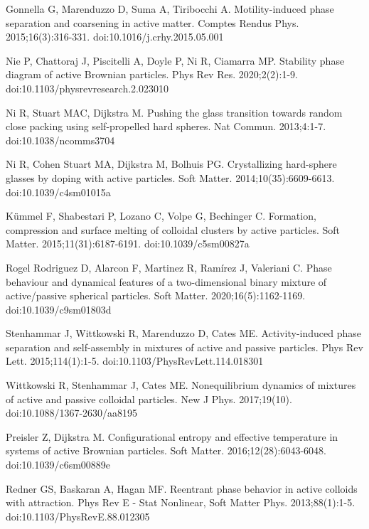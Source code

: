 \documentclass[11pt]{article}
\begin{document}
\begin{thebibliography}{9}
Gonnella G, Marenduzzo D, Suma A, Tiribocchi A. Motility-induced phase separation and coarsening in active matter. Comptes Rendus Phys. 2015;16(3):316-331. doi:10.1016/j.crhy.2015.05.001

Nie P, Chattoraj J, Piscitelli A, Doyle P, Ni R, Ciamarra MP. Stability phase diagram of active Brownian particles. Phys Rev Res. 2020;2(2):1-9. doi:10.1103/physrevresearch.2.023010

Ni R, Stuart MAC, Dijkstra M. Pushing the glass transition towards random close packing using self-propelled hard spheres. Nat Commun. 2013;4:1-7. doi:10.1038/ncomms3704

Ni R, Cohen Stuart MA, Dijkstra M, Bolhuis PG. Crystallizing hard-sphere glasses by doping with active particles. Soft Matter. 2014;10(35):6609-6613. doi:10.1039/c4sm01015a

Kümmel F, Shabestari P, Lozano C, Volpe G, Bechinger C. Formation, compression and surface melting of colloidal clusters by active particles. Soft Matter. 2015;11(31):6187-6191. doi:10.1039/c5sm00827a

Rogel Rodriguez D, Alarcon F, Martinez R, Ramírez J, Valeriani C. Phase behaviour and dynamical features of a two-dimensional binary mixture of active/passive spherical particles. Soft Matter. 2020;16(5):1162-1169. doi:10.1039/c9sm01803d











Stenhammar J, Wittkowski R, Marenduzzo D, Cates ME. Activity-induced phase separation and self-assembly in mixtures of active and passive particles. Phys Rev Lett. 2015;114(1):1-5. doi:10.1103/PhysRevLett.114.018301

Wittkowski R, Stenhammar J, Cates ME. Nonequilibrium dynamics of mixtures of active and passive colloidal particles. New J Phys. 2017;19(10). doi:10.1088/1367-2630/aa8195

Preisler Z, Dijkstra M. Configurational entropy and effective temperature in systems of active Brownian particles. Soft Matter. 2016;12(28):6043-6048. doi:10.1039/c6sm00889e

Redner GS, Baskaran A, Hagan MF. Reentrant phase behavior in active colloids with attraction. Phys Rev E - Stat Nonlinear, Soft Matter Phys. 2013;88(1):1-5. doi:10.1103/PhysRevE.88.012305


\end{thebibliography}
\end{document}

